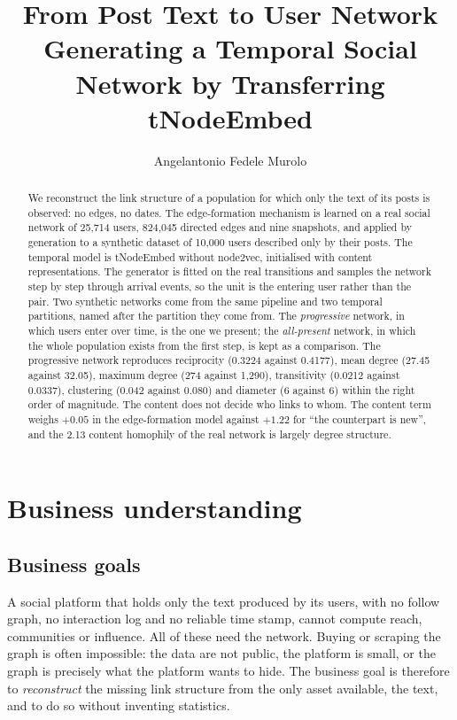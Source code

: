 \documentclass[11pt,a4paper]{article}
\title{\textbf{From Post Text to User Network}\\[0.3em]
\large Generating a Temporal Social Network by Transferring tNodeEmbed}
\author{Angelantonio Fedele Murolo}
\date{}
\begin{document}
\maketitle

\begin{abstract}
\noindent
We reconstruct the link structure of a population for which only the text of its posts is observed: no
edges, no dates. The edge-formation mechanism is learned on a real social network of 25,714 users,
824,045 directed edges and nine snapshots, and applied by generation to a synthetic dataset of 10,000
users described only by their posts. The temporal model is tNodeEmbed without node2vec, initialised with
content representations. The generator is fitted on the real transitions and samples the network step by
step through arrival events, so the unit is the entering user rather than the pair. Two synthetic
networks come from the same pipeline and two temporal partitions, named after the partition they come
from. The \emph{progressive} network, in which users enter over time, is the one we present; the
\emph{all-present} network, in which the whole population exists from the first step, is kept as a
comparison. The progressive network reproduces reciprocity (0.3224 against 0.4177), mean degree (27.45
against 32.05), maximum degree (274 against 1,290), transitivity (0.0212 against 0.0337), clustering
(0.042 against 0.080) and diameter (6 against 6) within the right order of magnitude. The content does
not decide who links to whom. The content term weighs $+0.05$ in the edge-formation model against
$+1.22$ for ``the counterpart is new'', and the 2.13 content homophily of the real network is largely
degree structure.
\end{abstract}

\tableofcontents
\newpage

\section{Business understanding}

\subsection{Business goals}
A social platform that holds only the text produced by its users, with no follow graph, no interaction
log and no reliable time stamp, cannot compute reach, communities or influence. All of these need the
network. Buying or scraping the graph is often impossible: the data are not public, the platform is
small, or the graph is precisely what the platform wants to hide. The business goal is therefore to
\emph{reconstruct} the missing link structure from the only asset available, the text, and to do so
without inventing statistics.
\end{document}
